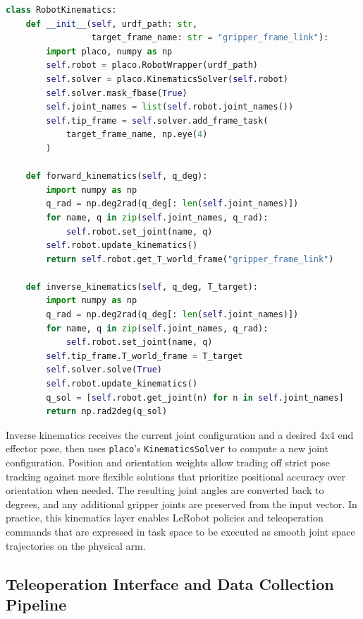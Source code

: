 \begin{lstlisting}[float=ht,language=Python,frame=tb,
caption={Skeleton of the \texttt{RobotKinematics} helper used in the LeRobot stack. Forward and inverse kinematics run in the same URDF joint space used for control and joint limit enforcement.},
label=lst:robot-kinematics]
class RobotKinematics:
    def __init__(self, urdf_path: str,
                 target_frame_name: str = "gripper_frame_link"):
        import placo, numpy as np
        self.robot = placo.RobotWrapper(urdf_path)
        self.solver = placo.KinematicsSolver(self.robot)
        self.solver.mask_fbase(True)
        self.joint_names = list(self.robot.joint_names())
        self.tip_frame = self.solver.add_frame_task(
            target_frame_name, np.eye(4)
        )

    def forward_kinematics(self, q_deg):
        import numpy as np
        q_rad = np.deg2rad(q_deg[: len(self.joint_names)])
        for name, q in zip(self.joint_names, q_rad):
            self.robot.set_joint(name, q)
        self.robot.update_kinematics()
        return self.robot.get_T_world_frame("gripper_frame_link")

    def inverse_kinematics(self, q_deg, T_target):
        import numpy as np
        q_rad = np.deg2rad(q_deg[: len(self.joint_names)])
        for name, q in zip(self.joint_names, q_rad):
            self.robot.set_joint(name, q)
        self.tip_frame.T_world_frame = T_target
        self.solver.solve(True)
        self.robot.update_kinematics()
        q_sol = [self.robot.get_joint(n) for n in self.joint_names]
        return np.rad2deg(q_sol)
\end{lstlisting}

Inverse kinematics receives the current joint configuration and a desired 4x4 end effector pose, then uses \texttt{placo}'s \texttt{KinematicsSolver} to compute a new joint configuration. Position and orientation weights allow trading off strict pose tracking against more flexible solutions that prioritize positional accuracy over orientation when needed. The resulting joint angles are converted back to degrees, and any additional gripper joints are preserved from the input vector. In practice, this kinematics layer enables LeRobot policies and teleoperation commands that are expressed in task space to be executed as smooth joint space trajectories on the physical arm.

\subsection{Teleoperation Interface and Data Collection Pipeline}

